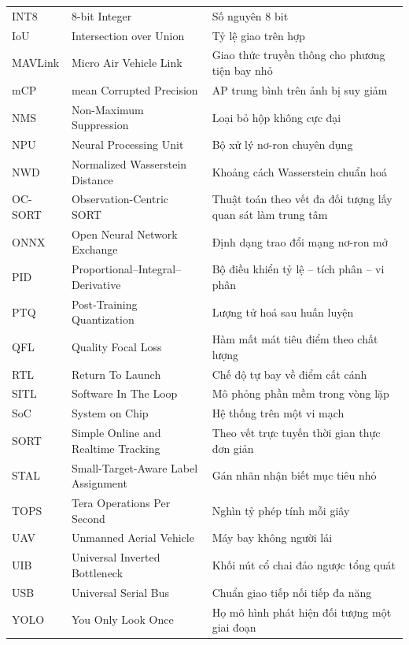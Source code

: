 \begin{singlespace}
\begin{longtable}{@{}p{2.8cm}p{6.1cm}p{6.1cm}@{}}
INT8 & 8-bit Integer & Số nguyên 8 bit\\
IoU & Intersection over Union & Tỷ lệ giao trên hợp\\
MAVLink & Micro Air Vehicle Link & Giao thức truyền thông cho phương tiện bay nhỏ\\
mCP & mean Corrupted Precision & AP trung bình trên ảnh bị suy giảm\\
NMS & Non-Maximum Suppression & Loại bỏ hộp không cực đại\\
NPU & Neural Processing Unit & Bộ xử lý nơ-ron chuyên dụng\\
NWD & Normalized Wasserstein Distance & Khoảng cách Wasserstein chuẩn hoá\\
OC-SORT & Observation-Centric SORT & Thuật toán theo vết đa đối tượng lấy quan sát làm trung tâm\\
ONNX & Open Neural Network Exchange & Định dạng trao đổi mạng nơ-ron mở\\
PID & Proportional–Integral–Derivative & Bộ điều khiển tỷ lệ – tích phân – vi phân\\
PTQ & Post-Training Quantization & Lượng tử hoá sau huấn luyện\\
QFL & Quality Focal Loss & Hàm mất mát tiêu điểm theo chất lượng\\
RTL & Return To Launch & Chế độ tự bay về điểm cất cánh\\
SITL & Software In The Loop & Mô phỏng phần mềm trong vòng lặp\\
SoC & System on Chip & Hệ thống trên một vi mạch\\
SORT & Simple Online and Realtime Tracking & Theo vết trực tuyến thời gian thực đơn giản\\
STAL & Small-Target-Aware Label Assignment & Gán nhãn nhận biết mục tiêu nhỏ\\
TOPS & Tera Operations Per Second & Nghìn tỷ phép tính mỗi giây\\
UAV & Unmanned Aerial Vehicle & Máy bay không người lái\\
UIB & Universal Inverted Bottleneck & Khối nút cổ chai đảo ngược tổng quát\\
USB & Universal Serial Bus & Chuẩn giao tiếp nối tiếp đa năng\\
YOLO & You Only Look Once & Họ mô hình phát hiện đối tượng một giai đoạn\\
\bottomrule
\end{longtable}
\end{singlespace}
\clearpage
